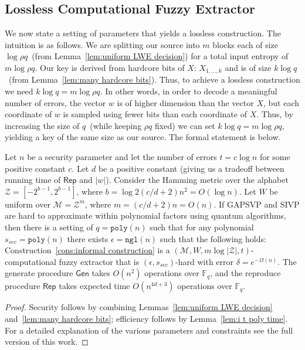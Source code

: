 \documentclass{llncs}
\newcommand{\lemref}[1]{\mbox{Lemma~\ref{#1}}}
\newcommand{\consref}[1]{\mbox{Construction~\ref{#1}}}
\newcommand{\class}[1]{{\ensuremath{\mathsf{#1}}}}
\newcommand{\gen}{\ensuremath{\class{Gen}}\xspace}
\newcommand{\rep}{\ensuremath{\class{Rep}}\xspace}
\newcommand{\Fq}{\ensuremath{\mathbb{F}_q}}
\newcommand{\poly}{\ensuremath{\mathtt{poly}}\xspace}
\newcommand{\ngl}{\ensuremath{\mathtt{ngl}}\xspace}
\newcommand{\M}{\mathcal{M}}
\begin{document}
\subsection{Lossless Computational Fuzzy Extractor}
\label{sec:lossless extractor}
We now state a setting of parameters that yields a lossless construction.  The intuition is as follows.  We are splitting our source into $m$ blocks each of size $\log \rho q$~(from \lemref{lem:uniform LWE decision}) for a total input entropy of $m\log \rho q$.  Our key is derived from hardcore bits of $X$: $X_{1,\dots, k}$ and is of size $k \log q$~(from \lemref{lem:many hardcore bits}). Thus, to achieve a lossless construction we need $k \log q = m\log \rho q$.
In other words, in order to decode a meaningful number of errors, the vector $w$ is of higher dimension than the vector $X$, but each coordinate of $w$ is sampled using fewer bits than each coordinate of $X$.    Thus, by increasing the size of $q$~(while keeping $\rho q$ fixed) we can set $k\log q = m\log \rho q$, yielding a key of the same size as our source.    The formal statement is below. 

\begin{theorem}
\label{thm:lossless secure extractor log}
Let $n$ be a security parameter and let the number of errors $t = c\log n$ for some positive constant $c$.    Let $d$ be a positive constant (giving us a tradeoff between running time of $\rep$ and $|w|$). Consider the Hamming metric over the alphabet $\mathcal{Z}=[-2^{b-1},2^{b-1}]$, where  $b = \log 2(c/d+2) n^2 =O(\log n)$.  Let $W$ be uniform over $\mathcal{M}=\mathcal{Z}^m$, where $m={(c/d+2)n}=O(n)$.  If GAPSVP and SIVP are hard to approximate within polynomial factors using quantum algorithms, then there is a setting of $q = \poly(n)$ such that for any polynomial $s_{sec}=\poly(n)$ there exists $\epsilon=\ngl(n)$ such that the following holds: \consref{cons:informal construction} is a $(\M, W, m\log |\mathcal{Z}|, t)$-computational fuzzy extractor that is $(\epsilon, s_{sec})$-hard with error $\delta = e^{-\Omega(n)}$.
The generate procedure $\gen$ takes $O(n^2)$ operations over $\Fq$, and the reproduce procedure $\rep$ takes expected time $O(n^{4d+3})$ operations over $\Fq$.
\end{theorem}
\begin{proof}
Security follows by combining Lemmas~\ref{lem:uniform LWE decision} and~\ref{lem:many hardcore bits}; efficiency follows by \lemref{lem:i t poly time}. For a detailed explanation of the various parameters and constraints see the full version of this work\cite{fullerMengReyzin2013}.  
\end{proof}
\end{document}

